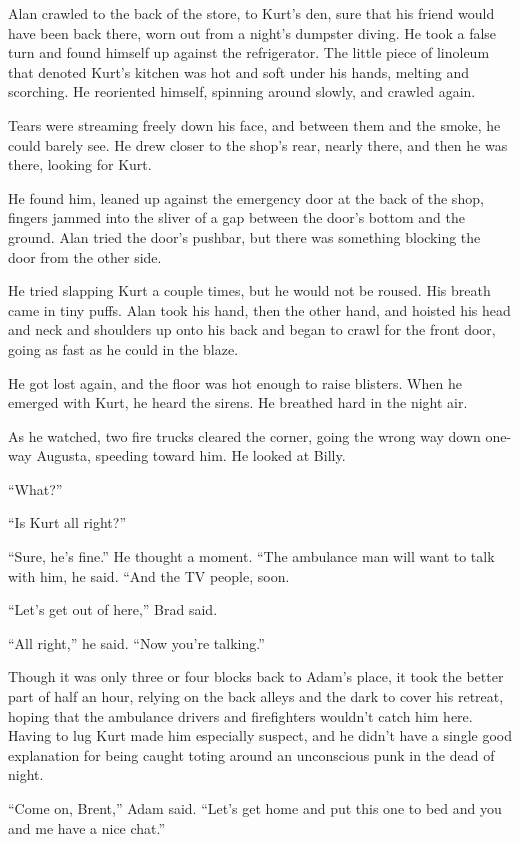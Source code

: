 Alan crawled to the back of the store, to Kurt's den, sure that his
friend would have been back there, worn out from a night's dumpster
diving.  He took a false turn and found himself up against the
refrigerator.  The little piece of linoleum that denoted Kurt's
kitchen was hot and soft under his hands, melting and scorching.  He
reoriented himself, spinning around slowly, and crawled again. 

Tears were streaming freely down his face, and between them and the
smoke, he could barely see.  He drew closer to the shop's rear, nearly
there, and then he was there, looking for Kurt.

He found him, leaned up against the emergency door at the back of the
shop, fingers jammed into the sliver of a gap between the door's
bottom and the ground.  Alan tried the door's pushbar, but there was
something blocking the door from the other side. 

He tried slapping Kurt a couple times, but he would not be roused. 
His breath came in tiny puffs.  Alan took his hand, then the other
hand, and hoisted his head and neck and shoulders up onto his back and
began to crawl for the front door, going as fast as he could in the
blaze.

He got lost again, and the floor was hot enough to raise blisters. 
When he emerged with Kurt, he heard the sirens.  He breathed hard in
the night air.

As he watched, two fire trucks cleared the corner, going the wrong way
down one-way Augusta, speeding toward him.  He looked at Billy.

``What?''

``Is Kurt all right?''

``Sure, he's fine.'' He thought a moment.  ``The ambulance man will
want to talk with him, he said.  ``And the TV people, soon.

``Let's get out of here,'' Brad said.

``All right,'' he said.  ``Now you're talking.''

Though it was only three or four blocks back to Adam's place, it took
the better part of half an hour, relying on the back alleys and the
dark to cover his retreat, hoping that the ambulance drivers and
firefighters wouldn't catch him here.  Having to lug Kurt made him
especially suspect, and he didn't have a single good explanation for
being caught toting around an unconscious punk in the dead of night.

``Come on, Brent,'' Adam said.  ``Let's get home and put this one to
bed and you and me have a nice chat.''


